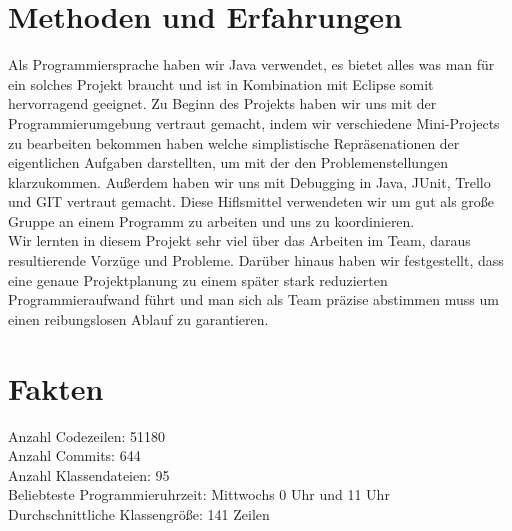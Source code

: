 \documentclass[a0, portrait, english, ngerman]{a0poster}
\begin{document}
\begin{multicols}{3}
\section{Methoden und Erfahrungen}

Als Programmiersprache haben wir Java verwendet, es bietet alles was man für ein solches Projekt braucht und ist in Kombination mit Eclipse somit hervorragend geeignet. Zu Beginn des Projekts haben wir uns mit der Programmierumgebung vertraut gemacht, indem wir verschiedene Mini-Projects zu bearbeiten bekommen haben welche simplistische Repräsenationen der eigentlichen Aufgaben darstellten, um mit der den Problemenstellungen klarzukommen. Außerdem haben wir uns mit Debugging in Java, JUnit, Trello und GIT vertraut gemacht. Diese Hiflsmittel verwendeten wir um gut als große Gruppe an einem Programm zu arbeiten und uns zu koordinieren.\\
Wir lernten in diesem Projekt sehr viel über das Arbeiten im Team, daraus resultierende Vorzüge und Probleme. Darüber hinaus haben wir festgestellt, dass eine genaue Projektplanung zu einem später stark reduzierten Programmieraufwand führt und man sich als Team präzise abstimmen muss um einen reibungslosen Ablauf zu garantieren.

\section{Fakten}
Anzahl Codezeilen: 51180 \\
Anzahl Commits: 644\\
Anzahl Klassendateien: 95 \\
Beliebteste Programmieruhrzeit: Mittwochs 0 Uhr und 11 Uhr\\
Durchschnittliche Klassengrö\ss{}e: 141 Zeilen \\

\end{multicols}
\end{document}
